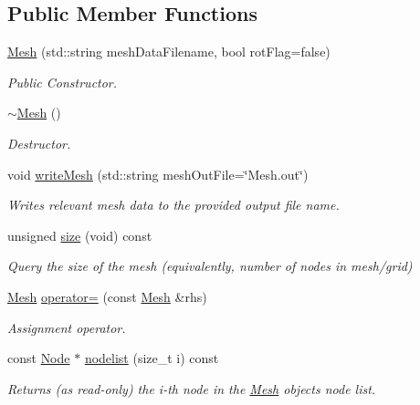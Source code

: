 \subsection*{Public Member Functions}
\begin{DoxyCompactItemize}
\item 
\mbox{\hyperlink{class_mesh_ade26657ad48e8e84af8a2614a8ac6b0c}{Mesh}} (std\+::string mesh\+Data\+Filename, bool rot\+Flag=false)
\begin{DoxyCompactList}\small\item\em Public Constructor. \end{DoxyCompactList}\item 
\mbox{\hyperlink{class_mesh_a5efe4da1a4c0971cfb037bd70304c303}{$\sim$\+Mesh}} ()
\begin{DoxyCompactList}\small\item\em Destructor. \end{DoxyCompactList}\item 
void \mbox{\hyperlink{class_mesh_a4d194fe4ce2b4fa4c11274c893c6ae29}{write\+Mesh}} (std\+::string mesh\+Out\+File=\char`\"{}Mesh.\+out\char`\"{})
\begin{DoxyCompactList}\small\item\em Writes relevant mesh data to the provided output file name. \end{DoxyCompactList}\item 
unsigned \mbox{\hyperlink{class_mesh_a716f8cde80ac5f0ed592aaa56995f618}{size}} (void) const
\begin{DoxyCompactList}\small\item\em Query the size of the mesh (equivalently, number of nodes in mesh/grid) \end{DoxyCompactList}\item 
\mbox{\hyperlink{class_mesh}{Mesh}} \mbox{\hyperlink{class_mesh_a732e258583e090537f7c47b9a7594e85}{operator=}} (const \mbox{\hyperlink{class_mesh}{Mesh}} \&rhs)
\begin{DoxyCompactList}\small\item\em Assignment operator. \end{DoxyCompactList}\item 
const \mbox{\hyperlink{class_node}{Node}} $\ast$ \mbox{\hyperlink{class_mesh_afbb98e084a07e94b5d3ad503aaa82e08}{nodelist}} (size\+\_\+t i) const
\begin{DoxyCompactList}\small\item\em Returns (as read-\/only) the i-\/th node in the \mbox{\hyperlink{class_mesh}{Mesh}} objects node list. \end{DoxyCompactList}\end{DoxyCompactItemize}


